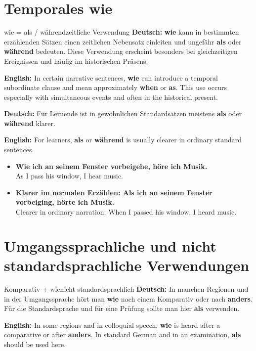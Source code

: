 \documentclass[a4paper,11pt]{article}
\newcommand{\GermanText}[1]{\textbf{Deutsch: }#1\par}
\newcommand{\EnglishText}[1]{{\small\color{SoftGray}\textbf{English: }#1\par}}
\newcommand{\ExampleItem}[2]{\item \textbf{#1}\\{\small\color{SoftGray}#2}}
\begin{document}
\section{Temporales \glqq wie\grqq}

\begin{grammarentry}{wie = als / während}{zeitliche Verwendung}
\GermanText{\textbf{wie} kann in bestimmten erzählenden Sätzen einen zeitlichen Nebensatz einleiten und ungefähr \textbf{als} oder \textbf{während} bedeuten. Diese Verwendung erscheint besonders bei gleichzeitigen Ereignissen und häufig im historischen Präsens.}
\EnglishText{In certain narrative sentences, \textbf{wie} can introduce a temporal subordinate clause and mean approximately \textbf{when} or \textbf{as}. This use occurs especially with simultaneous events and often in the historical present.}

\GermanText{Für Lernende ist in gewöhnlichen Standardsätzen meistens \textbf{als} oder \textbf{während} klarer.}
\EnglishText{For learners, \textbf{als} or \textbf{während} is usually clearer in ordinary standard sentences.}
\end{grammarentry}

\begin{exbox}
\begin{itemize}
\ExampleItem{Wie ich an seinem Fenster vorbeigehe, höre ich Musik.}{As I pass his window, I hear music.}
\ExampleItem{Klarer im normalen Erzählen: Als ich an seinem Fenster vorbeiging, hörte ich Musik.}{Clearer in ordinary narration: When I passed his window, I heard music.}
\end{itemize}
\end{exbox}

\section{Umgangssprachliche und nicht standardsprachliche Verwendungen}

\begin{grammarentry}{Komparativ + wie}{nicht standardsprachlich}
\GermanText{In manchen Regionen und in der Umgangssprache hört man \textbf{wie} nach einem Komparativ oder nach \textbf{anders}. Für die Standardsprache und für eine Prüfung sollte man hier \textbf{als} verwenden.}
\EnglishText{In some regions and in colloquial speech, \textbf{wie} is heard after a comparative or after \textbf{anders}. In standard German and in an examination, \textbf{als} should be used here.}
\end{grammarentry}
\end{document}
